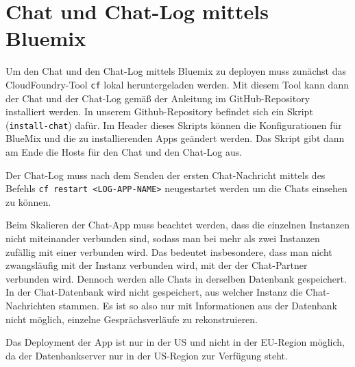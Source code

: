 \section{Chat und Chat-Log mittels Bluemix}

Um den Chat und den Chat-Log mittels Bluemix zu deployen muss zunächst das CloudFoundry-Tool \verb|cf| lokal heruntergeladen werden. Mit diesem Tool kann dann der Chat und der Chat-Log gemäß der Anleitung im GitHub-Repository installiert werden. In unserem Github-Repository befindet sich ein Skript (\verb|install-chat|) dafür. Im Header dieses Skripts können die Konfigurationen für BlueMix und die zu installierenden Apps geändert werden. Das Skript gibt dann am Ende die Hosts für den Chat und den Chat-Log aus.

Der Chat-Log muss nach dem Senden der ersten Chat-Nachricht mittels des Befehls \verb|cf restart <LOG-APP-NAME>| neugestartet werden um die Chats einsehen zu können.

Beim Skalieren der Chat-App muss beachtet werden, dass die einzelnen Instanzen nicht miteinander verbunden sind, sodass man bei mehr als zwei Instanzen zufällig mit einer verbunden wird. Das bedeutet insbesondere, dass man nicht zwangsläufig mit der Instanz verbunden wird, mit der der Chat-Partner verbunden wird. Dennoch werden alle Chats in derselben Datenbank gespeichert. In der Chat-Datenbank wird nicht gespeichert, aus welcher Instanz die Chat-Nachrichten stammen. Es ist so also nur mit Informationen aus der Datenbank nicht möglich, einzelne Gesprächsverläufe zu rekonstruieren.

Das Deployment der App ist nur in der US und nicht in der EU-Region möglich, da der Datenbankserver nur in der US-Region zur Verfügung steht.
